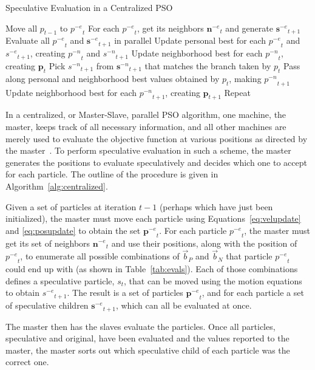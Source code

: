\documentclass[journal,letterpaper]{IEEEtran}
\newcommand{\alg}[1]{Algorithm~\ref{alg:#1}}
\providecommand{\nbest}{\ensuremath{\Vec{b}_N}}
\providecommand{\pbest}{\ensuremath{\Vec{b}_P}}
\providecommand{\noeval}[1]{\ensuremath{#1^{-e}}}
\providecommand{\nonbest}[1]{\ensuremath{#1^{-n}}}
\providecommand{\p}{\ensuremath{p}}
\providecommand{\pset}{\ensuremath{\mathbf{p}}}
\providecommand{\s}{\ensuremath{s}}
\providecommand{\sset}{\ensuremath{\mathbf{s}}}
\providecommand{\nset}{\ensuremath{\mathbf{n}}}
\begin{document}
\begin{algorithm}
  \caption{Speculative Evaluation in a Centralized PSO}
  \label{alg:centralized}
  \begin{algorithmic}[1]
	\STATE Move all $\p_{t-1}$ to $\noeval{\p}_t$
	\STATE For each $\noeval{\p}_t$, get its neighbors $\noeval{\nset}_t$ and
	  generate $\noeval{\sset}_{t+1}$
	\STATE Evaluate all $\noeval{\p}_t$ and $\noeval{\sset}_{t+1}$ in parallel
	\STATE Update personal best for each $\noeval{\p}_t$ and
	  $\noeval{\s}_{t+1}$, creating $\nonbest{\p}_t$ and $\nonbest{\s}_{t+1}$
	\STATE Update neighborhood best for each $\nonbest{\p}_t$, creating
	  $\pset_t$
	\FORALL{$\p_t$}
	\STATE Pick $\nonbest{\s}_{t+1}$ from $\nonbest{\sset}_{t+1}$ that matches
	  the branch taken by $\p_t$
	\STATE Pass along personal and neighborhood best values obtained by $\p_t$,
	  making $\nonbest{\p}_{t+1}$
	\ENDFOR
	\STATE Update neighborhood best for each $\nonbest{\p}_{t+1}$, creating
	  $\pset_{t+1}$
	\STATE Repeat
  \end{algorithmic}
\end{algorithm}

In a centralized, or Master-Slave, parallel PSO algorithm, one machine, the
master, keeps track of all necessary information, and all other machines are
merely used to evaluate the objective function at various positions as directed
by the master~\cite{belal-ijicis04}.  To perform speculative evaluation in such
a scheme, the master generates the positions to evaluate speculatively and
decides which one to accept for each particle.  The outline of the procedure is
given in \alg{centralized}.

Given a set of particles at iteration $t-1$ (perhaps which have just been
initialized), the master must move each particle using
Equations~\eqref{eq:velupdate} and \eqref{eq:posupdate} to obtain the set
$\noeval{\pset}_t$.  For each particle $\noeval{\p}_t$, the master must get its
set of neighbors $\noeval{\nset}_t$ and use their positions, along with the
position of $\noeval{\p}_t$, to enumerate all possible combinations of $\pbest$
and $\nbest$ that particle $\noeval{\p}_t$ could end up with (as shown in
Table~\ref{tab:evals}).  Each of those combinations defines a speculative
particle, $\s_t$, that can be moved using the motion equations to obtain
$\noeval{\s}_{t+1}$.  The result is a set of particles $\noeval{\pset}_t$, and
for each particle a set of speculative children $\noeval{\sset}_{t+1}$, which
can all be evaluated at once.

The master then has the slaves evaluate the particles.  Once all particles,
speculative and original, have been evaluated and the values reported to the
master, the master sorts out which speculative child of each particle was the
correct one.
\end{document}
